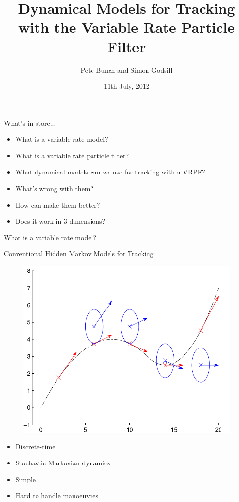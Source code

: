 \documentclass{beamer}
\title[Variable Rate Tracking]{Dynamical Models for Tracking with the Variable Rate Particle Filter}
\author[P. Bunch \& S. Godsill]{Pete Bunch and Simon Godsill}
\institute[CUED SigProC]{Cambridge University Engineering Department\\ Signal Processing \& Communications Lab}
\date{11th July, 2012}
\begin{document}
\begin{frame}
\titlepage
\end{frame}

\begin{frame}{What's in store...}
\begin{itemize}
  \item What is a variable rate model?
  \item What is a variable rate particle filter?
  \item What dynamical models can we use for tracking with a VRPF?
  \item What's wrong with them?
  \item How can make them better?
  \item Does it work in 3 dimensions?
\end{itemize}
\end{frame}

\begin{frame}
What is a variable rate model?
\end{frame}

\begin{frame}{Conventional Hidden Markov Models for Tracking}
\begin{figure}\centering\includegraphics[scale=0.5]{HMM_model.pdf}\end{figure}
\begin{itemize}
  \item Discrete-time
  \item Stochastic Markovian dynamics
  \item Simple
  \item Hard to handle manoeuvres
\end{itemize}
\end{frame}
\end{document}

